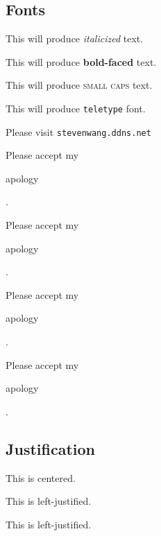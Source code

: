 \documentclass[12pt]{article}
\begin{document}
\subsection{Fonts}

This will produce \textit{italicized} text.

This will produce \textbf{bold-faced} text.

This will produce \textsc{small caps} text.

This will produce \texttt{teletype} font.

Please visit \texttt{stevenwang.ddns.net}

Please accept my \begin{large} apology \end{large}.

Please accept my \begin{huge} apology \end{huge}.

Please accept my \begin{small} apology \end{small}.

Please accept my \begin{tiny} apology \end{tiny}.

\subsection{Justification}

\begin{center}This is centered.\end{center}

\begin{flushleft}This is left-justified.\end{flushleft}
\begin{flushright}This is left-justified.\end{flushright}
\end{document}
